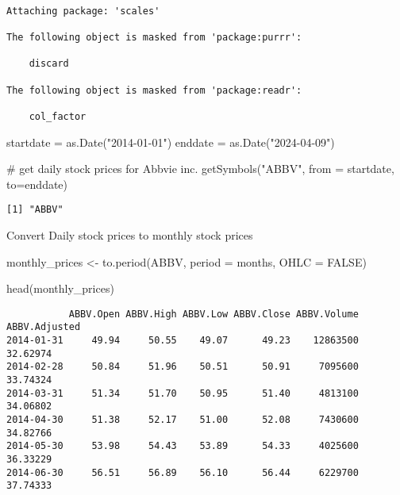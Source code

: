 \documentclass[
  letterpaper,
  DIV=11,
  numbers=noendperiod]{scrartcl}
\newenvironment{Shaded}{\begin{snugshade}}{\end{snugshade}}
\newcommand{\AttributeTok}[1]{\textcolor[rgb]{0.40,0.45,0.13}{#1}}
\newcommand{\CommentTok}[1]{\textcolor[rgb]{0.37,0.37,0.37}{#1}}
\newcommand{\ConstantTok}[1]{\textcolor[rgb]{0.56,0.35,0.01}{#1}}
\newcommand{\FunctionTok}[1]{\textcolor[rgb]{0.28,0.35,0.67}{#1}}
\newcommand{\NormalTok}[1]{\textcolor[rgb]{0.00,0.23,0.31}{#1}}
\newcommand{\OtherTok}[1]{\textcolor[rgb]{0.00,0.23,0.31}{#1}}
\newcommand{\StringTok}[1]{\textcolor[rgb]{0.13,0.47,0.30}{#1}}
\begin{document}
\begin{verbatim}

Attaching package: 'scales'

The following object is masked from 'package:purrr':

    discard

The following object is masked from 'package:readr':

    col_factor
\end{verbatim}

\begin{Shaded}
\begin{Highlighting}[]
\NormalTok{startdate }\OtherTok{=} \FunctionTok{as.Date}\NormalTok{(}\StringTok{"2014{-}01{-}01"}\NormalTok{)}
\NormalTok{enddate }\OtherTok{=} \FunctionTok{as.Date}\NormalTok{(}\StringTok{"2024{-}04{-}09"}\NormalTok{)}

 \CommentTok{\# get daily stock prices for Abbvie inc.}
\FunctionTok{getSymbols}\NormalTok{(}\StringTok{"ABBV"}\NormalTok{, }\AttributeTok{from =}\NormalTok{ startdate, }\AttributeTok{to=}\NormalTok{enddate)}
\end{Highlighting}
\end{Shaded}

\begin{verbatim}
[1] "ABBV"
\end{verbatim}

Convert Daily stock prices to monthly stock prices

\begin{Shaded}
\begin{Highlighting}[]
\NormalTok{monthly\_prices }\OtherTok{\textless{}{-}} \FunctionTok{to.period}\NormalTok{(ABBV, }\AttributeTok{period =} \StringTok{\textquotesingle{}months\textquotesingle{}}\NormalTok{, }\AttributeTok{OHLC =} \ConstantTok{FALSE}\NormalTok{)}

\FunctionTok{head}\NormalTok{(monthly\_prices)}
\end{Highlighting}
\end{Shaded}

\begin{verbatim}
           ABBV.Open ABBV.High ABBV.Low ABBV.Close ABBV.Volume ABBV.Adjusted
2014-01-31     49.94     50.55    49.07      49.23    12863500      32.62974
2014-02-28     50.84     51.96    50.51      50.91     7095600      33.74324
2014-03-31     51.34     51.70    50.95      51.40     4813100      34.06802
2014-04-30     51.38     52.17    51.00      52.08     7430600      34.82766
2014-05-30     53.98     54.43    53.89      54.33     4025600      36.33229
2014-06-30     56.51     56.89    56.10      56.44     6229700      37.74333
\end{verbatim}
\end{document}
